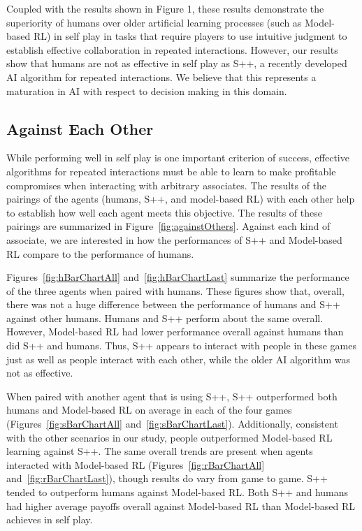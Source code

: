 \documentclass[fleqn,10pt]{SelfArx}
\begin{document}
Coupled with the results shown in Figure 1, these results demonstrate the superiority of humans over older artificial learning processes (such as Model-based RL) in self play in tasks that require players to use intuitive judgment to establish effective collaboration in repeated interactions.  However, our results show that humans are not as effective in self play as S++, a recently developed AI algorithm for repeated interactions.  We believe that this represents a maturation in AI with respect to decision making in this domain.

\subsection{Against Each Other}
While performing well in self play is one important criterion of success, effective algorithms for repeated interactions must be able to learn to make profitable compromises when interacting with arbitrary associates.  The results of the pairings of the agents (humans, S++, and model-based RL) with each other help to establish how well each agent meets this objective.  The results of these pairings are summarized in Figure~\ref{fig:againstOthers}.  Against each kind of associate, we are interested in how the performances of S++ and Model-based RL compare to the performance of humans.

Figures~\ref{fig:hBarChartAll} and~\ref{fig:hBarChartLast} summarize the performance of the three agents when paired with humans.  These figures show that, overall, there was not a huge difference between the performance of humans and S++ against other humans.  Humans and S++ perform about the same overall.  However, Model-based RL had lower performance overall against humans than did S++ and humans.  Thus, S++ appears to interact with people in these games just as well as people interact with each other, while the older AI algorithm was not as effective.

When paired with another agent that is using S++, S++ outperformed both humans and Model-based RL on average in each of the four games (Figures~\ref{fig:sBarChartAll} and~\ref{fig:sBarChartLast}).  Additionally, consistent with the other scenarios in our study, people outperformed Model-based RL learning against S++.  The same overall trends are present when agents interacted with Model-based RL (Figures~\ref{fig:rBarChartAll} and~\ref{fig:rBarChartLast}), though results do vary from game to game.  S++ tended to outperform humans against Model-based RL.  Both S++ and humans had higher average payoffs overall against Model-based RL than Model-based RL achieves in self play.
\end{document}
